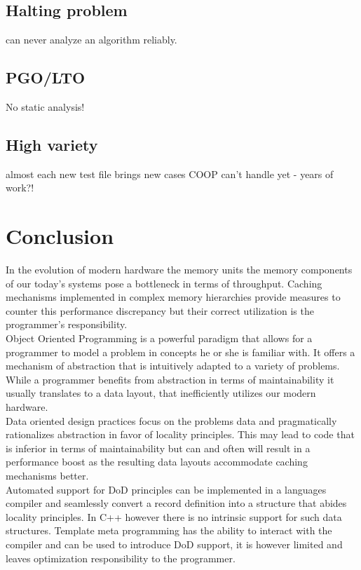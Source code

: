 \subsection{Halting problem}
can never analyze an algorithm reliably.

\subsection{PGO/LTO}
No static analysis!

\subsection{High variety}
almost each new test file brings new cases COOP can't handle yet - years of work?!

\section{Conclusion}
In the evolution of modern hardware the memory units the memory components of our today's systems pose a bottleneck in terms of throughput. Caching mechanisms implemented in complex memory hierarchies provide measures to counter this performance discrepancy but their correct utilization is the programmer's responsibility.\\
Object Oriented Programming is a powerful paradigm that allows for a programmer to model a problem in concepts he or she is familiar with. It offers a mechanism of abstraction that is intuitively adapted to a variety of problems. While a programmer benefits from abstraction in terms of maintainability it usually translates to a data layout, that inefficiently utilizes our modern hardware.\\
Data oriented design practices focus on the problems data and pragmatically rationalizes abstraction in favor of locality principles. This may lead to code that is inferior in terms of maintainability but can and often will result in a performance boost as the resulting data layouts accommodate caching mechanisms better.\\
Automated support for DoD principles can be implemented in a languages compiler and seamlessly convert a record definition into a structure that abides locality principles. In C++ however there is no intrinsic support for such data structures. Template meta programming has the ability to interact with the compiler and can be used to introduce DoD support, it is however limited and leaves optimization responsibility to the programmer.\\
